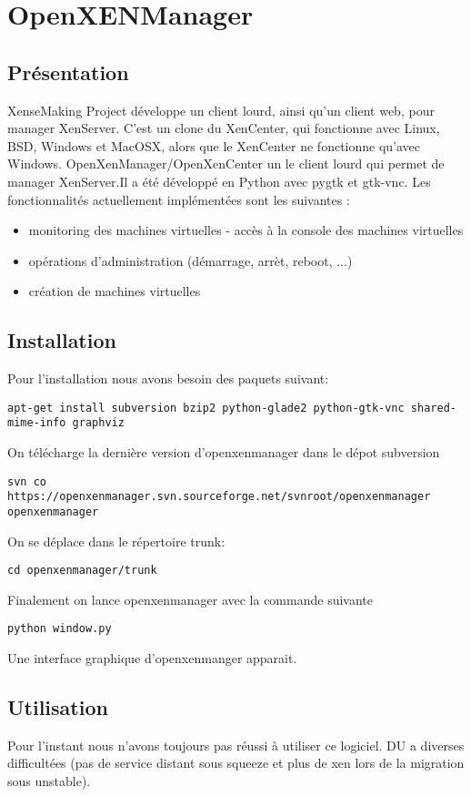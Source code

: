 \lstset{language=bash}
\chapter{OpenXENManager}
\section{Présentation}
XenseMaking Project développe un client lourd, ainsi qu'un client
web, pour manager XenServer. C'est un clone du XenCenter, qui fonctionne
avec Linux, BSD, Windows et MacOSX, alors que le XenCenter ne fonctionne
qu'avec Windows. OpenXenManager/OpenXenCenter un le client lourd qui
permet de manager XenServer.Il a été développé en Python avec pygtk
et gtk-vnc.
Les fonctionnalités actuellement implémentées sont les suivantes :
\begin{itemize}
\item monitoring des machines virtuelles - accès à la console des machines virtuelles
\item opérations d'administration (démarrage, arrèt, reboot, ...)
\item création de machines virtuelles
\end{itemize}
\section{Installation}
Pour l'installation nous avons besoin des paquets suivant:
\begin{lstlisting}
apt-get install subversion bzip2 python-glade2 python-gtk-vnc shared-mime-info graphviz
\end{lstlisting}
On télécharge la dernière version d'openxenmanager dans le dépot subversion
\begin{lstlisting}
svn co https://openxenmanager.svn.sourceforge.net/svnroot/openxenmanager openxenmanager
\end{lstlisting}
On se déplace dans le répertoire trunk:
\begin{lstlisting}
cd openxenmanager/trunk
\end{lstlisting}
Finalement on lance openxenmanager avec la commande suivante
\begin{lstlisting}
python window.py
\end{lstlisting}
Une interface graphique d'openxenmanger apparait.
\section{Utilisation}
Pour l'instant nous n'avons toujours pas réussi à utiliser ce logiciel. DU a diverses difficultées (pas de service distant sous squeeze et plus de xen lors de la migration sous unstable).
